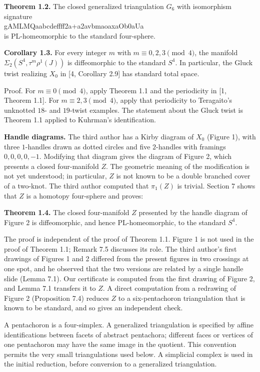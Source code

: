 \documentclass[11pt,letterpaper]{article}
\begin{document}
\medskip\noindent\textbf{Theorem 1.2.} The closed generalized triangulation $G_6$ with isomorphism signature \hfil\\\mbox{\small\ttfamily gAMLMQaabcdeffff2a+a2avbmaoaxaOb0aUa}\hfil\\ is PL-homeomorphic to the standard four-sphere.

\medskip\noindent\textbf{Corollary 1.3.} For every integer $m$ with $m\equiv0,2,3\pmod4$, the manifold $\Sigma_2(S^4,\tau^m\rho^1(J))$ is diffeomorphic to the standard $S^4$. In particular, the Gluck twist realizing $X_0$ in [4, Corollary 2.9] has standard total space.

Proof. For $m\equiv0\pmod4$, apply Theorem 1.1 and the periodicity in [1, Theorem 1.1]. For $m\equiv2,3\pmod4$, apply that periodicity to Teragaito's unknotted $18$- and $19$-twist examples. The statement about the Gluck twist is Theorem 1.1 applied to Kuhrman's identification.

\medskip\noindent\textbf{Handle diagrams.} The third author has a Kirby diagram of $X_0$ (Figure 1), with three $1$-handles drawn as dotted circles and five $2$-handles with framings $0,0,0,0,-1$. Modifying that diagram gives the diagram of Figure 2, which presents a closed four-manifold $Z$. The geometric meaning of the modification is not yet understood; in particular, $Z$ is not known to be a double branched cover of a two-knot. The third author computed that $\pi_1(Z)$ is trivial. Section 7 shows that $Z$ is a homotopy four-sphere and proves:

\medskip\noindent\textbf{Theorem 1.4.} The closed four-manifold $Z$ presented by the handle diagram of Figure 2 is diffeomorphic, and hence PL-homeomorphic, to the standard $S^4$.

The proof is independent of the proof of Theorem 1.1. Figure 1 is not used in the proof of Theorem 1.1; Remark 7.5 discusses its role. The third author's first drawings of Figures 1 and 2 differed from the present figures in two crossings at one spot, and he observed that the two versions are related by a single handle slide (Lemma 7.1). Our certificate is computed from the first drawing of Figure 2, and Lemma 7.1 transfers it to $Z$. A direct computation from a redrawing of Figure 2 (Proposition 7.4) reduces $Z$ to a six-pentachoron triangulation that is known to be standard, and so gives an independent check.

A pentachoron is a four-simplex. A generalized triangulation is specified by affine identifications between facets of abstract pentachora; different faces or vertices of one pentachoron may have the same image in the quotient. This convention permits the very small triangulations used below. A simplicial complex is used in the initial reduction, before conversion to a generalized triangulation.
\end{document}
